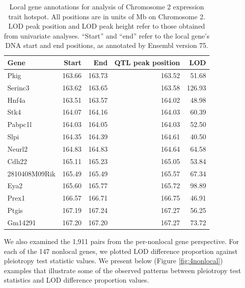 \documentclass[oneside]{book}\usepackage[]{graphicx}\usepackage[]{color}
\begin{document}
\begin{table}[ht]
\centering
\begin{tabular}{lrrrr}
  \hline
Gene & Start & End & QTL peak position & LOD\\
  \hline
Pkig & 163.66 & 163.73 & 163.52 & 51.68 \\
  Serinc3 & 163.62 & 163.65 & 163.58 & 126.93 \\
  Hnf4a & 163.51 & 163.57 & 164.02 & 48.98 \\
  Stk4 & 164.07 & 164.16 & 164.03 & 60.39 \\
  Pabpc1l & 164.03 & 164.05 & 164.03 & 52.50 \\
  Slpi & 164.35 & 164.39 & 164.61 & 40.50 \\
  Neurl2 & 164.83 & 164.83 & 164.64 & 64.58 \\
  Cdh22 & 165.11 & 165.23 & 165.05 & 53.84 \\
  2810408M09Rik & 165.49 & 165.49 & 165.57 & 67.34 \\
  Eya2 & 165.60 & 165.77 & 165.72 & 98.89 \\
  Prex1 & 166.57 & 166.71 & 166.75 & 46.91 \\
  Ptgis & 167.19 & 167.24 & 167.27 & 56.25 \\
  Gm14291 & 167.20 & 167.20 & 167.27 & 73.72 \\
   \hline
\end{tabular}
\caption{Local gene annotations for analysis of Chromosome 2 expression trait hotspot. 
All positions are in units of Mb on Chromosome 2. 
LOD peak position and LOD peak height refer to those obtained from univariate analyses. 
``Start'' and ``end'' refer to the local gene's DNA start and end positions, as annotated by Ensembl version 75.}
\label{tab:annot}
\end{table}


We also examined the 1,911 pairs from the per-nonlocal gene perspective. 
For each of the 147 nonlocal genes, we plotted LOD difference proportion 
against pleiotropy test statistic values. 
We present below (Figure \ref{fig:4nonlocal}) examples that illustrate some of the 
observed patterns between pleiotropy test statistics and LOD difference proportion values.
\end{document}
